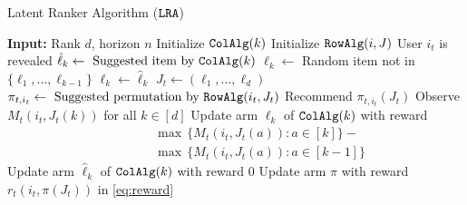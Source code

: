 

\begin{algorithm}[t]
  \caption{Latent Ranker Algorithm (${\tt LRA}$)}
  \label{alg:latent ranker}
  \begin{algorithmic}[1]
    \State \textbf{Input:} Rank $d$, horizon $n$
    \State
      \State Initialize ${\tt ColAlg}(k)$
    \EndFor
      \State Initialize ${\tt RowAlg}(i, J)$
    \EndFor
    \State
      \State User $i_t$ is revealed
        \State $\hat{\ell}_k \gets \text{ Suggested item by } {\tt ColAlg}(k)$
          \State $\ell_k \gets$ Random item not in $\{\ell_1, \dots, \ell_{k - 1}\}$
        \Else
          \State $\ell_k \gets \hat{\ell}_k$
        \EndIf
      \EndFor
      \State $J_t \gets (\ell_1, \dots, \ell_d)$
      \State $\pi_{t, i_t} \gets \text{ Suggested permutation by } {\tt RowAlg}(i_t, J_t)$
      \State
      \State Recommend $\pi_{t, i_t}(J_t)$
      \State Observe $M_t(i_t, J_t(k))$ for all $k \in [d]$
      \State
          \State Update arm $\ell_k$ of ${\tt ColAlg}(k)$ with reward
          \begin{align*}
            \qquad \quad & \max \, \{M_t(i_t, J_t(a)): a \in [k]\} - {} \\
            & \max \, \{M_t(i_t, J_t(a)): a \in [k - 1]\}
          \end{align*}
        \Else
          \State Update arm $\hat{\ell}_k$ of ${\tt ColAlg}(k)$ with reward $0$
        \EndIf
      \EndFor
        \State Update arm $\pi$ with reward $r_t(i_t, \pi(J_t))$ in \eqref{eq:reward}
      \EndFor
    \EndFor
  \end{algorithmic}
\end{algorithm}


